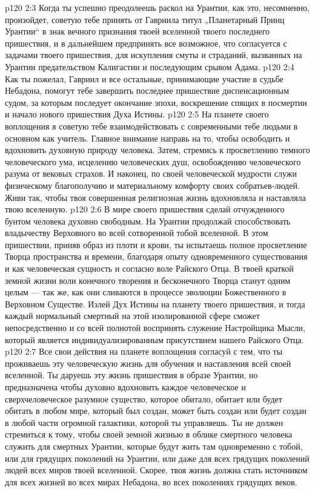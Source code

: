\vs p120 2:3 \bibnobreakspace Когда ты успешно преодолеешь раскол на Урантии, как это, несомненно, произойдет, советую тебе принять от Гавриила титул „Планетарный Принц Урантии“ в знак вечного признания твоей вселенной твоего последнего пришествия, и в дальнейшем предпринять все возможное, что согласуется с задачами твоего пришествия, для искупления смуты и страданий, вызванных на Урантии предательством Калигастии и последующим срывом Адама.
\vs p120 2:4 \bibnobreakspace Как ты пожелал, Гавриил и все остальные, принимающие участие в судьбе Небадона, помогут тебе завершить последнее пришествие диспенсационным судом, за которым последует окончание эпохи, воскрешение спящих в посмертии и начало нового пришествия Духа Истины.
\vs p120 2:5 \bibnobreakspace На планете своего воплощения я советую тебе взаимодействовать с современными тебе людьми в основном как учитель. Главное внимание направь на то, чтобы освободить и вдохновить духовную природу человека. Затем, стремись к просветлению темного человеческого ума, исцелению человеческих душ, освобождению человеческого разума от вековых страхов. И наконец, по своей человеческой мудрости служи физическому благополучию и материальному комфорту своих собратьев\hyp{}людей. Живи так, чтобы твоя совершенная религиозная жизнь вдохновляла и наставляла твою вселенную.
\vs p120 2:6 \bibnobreakspace В мире своего пришествия сделай отчужденного бунтом человека духовно свободным. На Урантии продолжай способствовать владычеству Верховного во всей сотворенной тобой вселенной. В этом пришествии, приняв образ из плоти и крови, ты испытаешь полное просветление Творца пространства и времени, благодаря опыту одновременного существования и как человеческая сущность и согласно воле Райского Отца. В твоей краткой земной жизни воли конечного творения и бесконечного Творца станут одним целым --- так же, как они сливаются в процессе эволюции Божественного в Верховном Существе. Излей Дух Истины на планету твоего пришествия, и тогда каждый нормальный смертный на этой изолированной сфере сможет непосредственно и со всей полнотой воспринять служение Настройщика Мысли, который является индивидуализированным присутствием нашего Райского Отца.
\vs p120 2:7 \bibnobreakspace Все свои действия на планете воплощения согласуй с тем, что ты проживаешь эту человеческую жизнь для обучения и наставления всей своей вселенной. Ты даруешь эту жизнь пришествия в образе  Урантии, но предназначена  чтобы духовно вдохновить каждое человеческое и сверхчеловеческое разумное существо, которое обитало, обитает или будет обитать в любом мире, который был создан, может быть создан или будет создан в любой части огромной галактики, которой ты управляешь. Ты не должен стремиться к тому, чтобы своей земной жизнью в облике смертного человека служить  для смертных Урантии, которые будут жить там одновременно с тобой, или для грядущих поколений на Урантии, или даже для всех грядущих поколений людей всех миров твоей вселенной. Скорее, твоя жизнь должна стать источником  для всех жизней во всех мирах Небадона, во всех поколениях грядущих веков.
